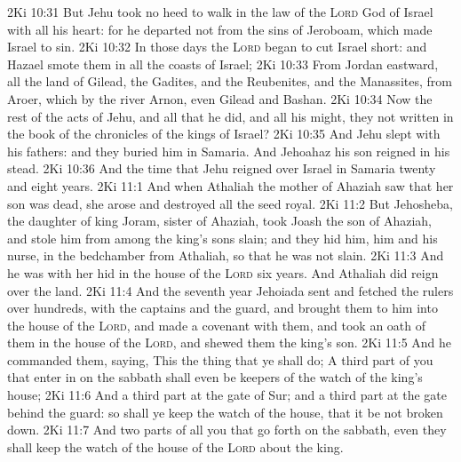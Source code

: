 \vs 2Ki 10:31 But Jehu took no heed to walk in the law of the \textsc{Lord} God of Israel with all his heart: for he departed not from the sins of Jeroboam, which made Israel to sin.
\vs 2Ki 10:32 In those days the \textsc{Lord} began to cut Israel short: and Hazael smote them in all the coasts of Israel;
\vs 2Ki 10:33 From Jordan eastward, all the land of Gilead, the Gadites, and the Reubenites, and the Manassites, from Aroer, which  by the river Arnon, even Gilead and Bashan.
\vs 2Ki 10:34 Now the rest of the acts of Jehu, and all that he did, and all his might,  they not written in the book of the chronicles of the kings of Israel?
\vs 2Ki 10:35 And Jehu slept with his fathers: and they buried him in Samaria. And Jehoahaz his son reigned in his stead.
\vs 2Ki 10:36 And the time that Jehu reigned over Israel in Samaria  twenty and eight years.
\vs 2Ki 11:1 And when Athaliah the mother of Ahaziah saw that her son was dead, she arose and destroyed all the seed royal.
\vs 2Ki 11:2 But Jehosheba, the daughter of king Joram, sister of Ahaziah, took Joash the son of Ahaziah, and stole him from among the king's sons  slain; and they hid him,  him and his nurse, in the bedchamber from Athaliah, so that he was not slain.
\vs 2Ki 11:3 And he was with her hid in the house of the \textsc{Lord} six years. And Athaliah did reign over the land.
\vs 2Ki 11:4 And the seventh year Jehoiada sent and fetched the rulers over hundreds, with the captains and the guard, and brought them to him into the house of the \textsc{Lord}, and made a covenant with them, and took an oath of them in the house of the \textsc{Lord}, and shewed them the king's son.
\vs 2Ki 11:5 And he commanded them, saying, This  the thing that ye shall do; A third part of you that enter in on the sabbath shall even be keepers of the watch of the king's house;
\vs 2Ki 11:6 And a third part  at the gate of Sur; and a third part at the gate behind the guard: so shall ye keep the watch of the house, that it be not broken down.
\vs 2Ki 11:7 And two parts of all you that go forth on the sabbath, even they shall keep the watch of the house of the \textsc{Lord} about the king.
